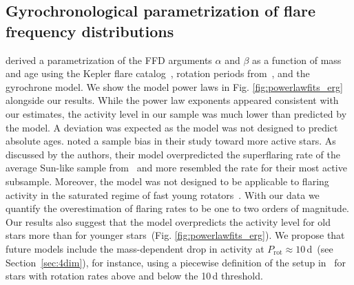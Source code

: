 \documentclass{aa}
\begin{document}
\subsection{Gyrochronological parametrization of flare frequency distributions}
\label{sec:davenport}
\citet{davenport2019} derived a parametrization of the FFD arguments $\alpha$ and $\beta$ as a function of mass and age using the Kepler flare catalog~\citep{davenport_kepler_2016}, rotation periods from~\citet{mcquillan2014}, and the \citet{mamajek2008} gyrochrone model. We show the model power laws in Fig. \ref{fig:powerlawfits_erg} alongside our results. While the power law exponents appeared consistent with our estimates, the activity level in our sample was much lower than predicted by the model. A deviation was expected as the model was not designed to predict absolute ages. \citet{davenport2019} noted a sample bias in their study toward more active stars. As discussed by the authors, their model overpredicted the superflaring rate of the average Sun-like sample from~\citet{shibayama2013} and more resembled the rate for their most active subsample. Moreover, the model was not designed to be applicable to flaring activity in the saturated regime of fast young rotators~\citep{jackman2020}. With our data we quantify the overestimation of flaring rates to be one to two orders of magnitude. Our results also suggest that the model overpredicts the activity level for old stars more than for younger stars~(Fig. \ref{fig:powerlawfits_erg}). We propose that future models include the mass-dependent drop in activity at $P_\mathrm{rot}\approx 10\,$d~(see Section~\ref{sec:4dim}), for instance, using a piecewise definition of the setup in~\citet{davenport2019} for stars with rotation rates above and below the 10\,d threshold.
\end{document}
